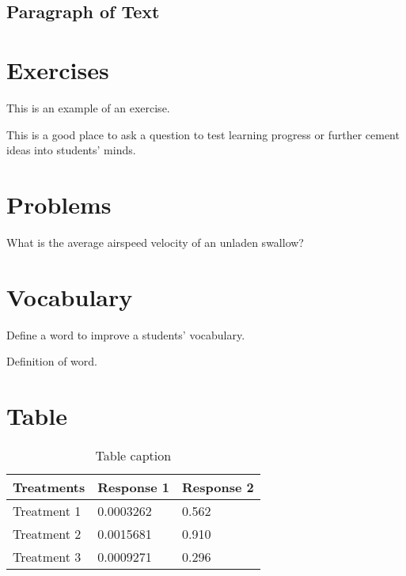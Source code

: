 \subsection{Paragraph of Text}



\section{Exercises}

This is an example of an exercise.

\begin{exercise}
	This is a good place to ask a question to test learning progress or further cement ideas into students' minds.
\end{exercise}


\section{Problems}

\begin{problem}
	What is the average airspeed velocity of an unladen swallow?
\end{problem}


\section{Vocabulary}

Define a word to improve a students' vocabulary.

\begin{vocabulary}[Word]
	Definition of word.
\end{vocabulary}


\section{Table}

\begin{table}[h]
	\centering
	\begin{tabular}{l l l}
		\toprule
		\textbf{Treatments} & \textbf{Response 1} & \textbf{Response 2}\\
		\midrule
		Treatment 1 & 0.0003262 & 0.562 \\
		Treatment 2 & 0.0015681 & 0.910 \\
		Treatment 3 & 0.0009271 & 0.296 \\
		\bottomrule
	\end{tabular}
	\caption{Table caption}
	\label{tab:example} %
\end{table}

